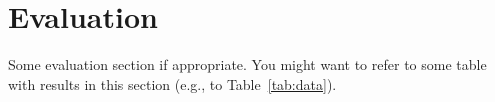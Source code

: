 \section{Evaluation} \label{evaluation}

Some evaluation section if appropriate. You might want to refer to some table with results in this section (e.g., to Table~\ref{tab:data}).



